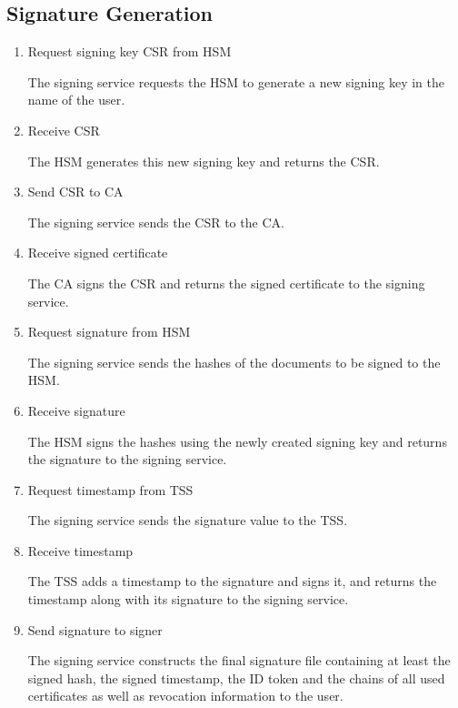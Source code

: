 \subsection{Signature Generation}\label{subsec:signature-generation}
\begin{enumerate}[resume]
    \item Request signing key \gls{CSR} from \gls{HSM}

    The signing service requests the \gls{HSM} to generate a new signing key in the name of the user.

    \item Receive \gls{CSR}

    The \gls{HSM} generates this new signing key and returns the \acrfull{CSR}.

    \item Send \gls{CSR} to \gls{CA}

    The signing service sends the \gls{CSR} to the \gls{CA}.

    \item Receive signed certificate

    The \gls{CA} signs the \gls{CSR} and returns the signed certificate to the signing service.

    \item Request signature from \gls{HSM}

    The signing service sends the hashes of the documents to be signed to the \gls{HSM}.

    \item Receive signature

    The \gls{HSM} signs the hashes using the newly created signing key and returns the signature to the signing service.

    \item Request timestamp from \gls{TSS}

    The signing service sends the signature value to the \gls{TSS}.

    \item Receive timestamp

    The \gls{TSS} adds a timestamp to the signature and signs it,
    and returns the timestamp along with its signature to the signing service.

    \item Send signature to signer

    The signing service constructs the final signature file containing at least the signed hash,
    the signed timestamp, the ID token and the chains of all used certificates as well as revocation information to the user.
\end{enumerate}

